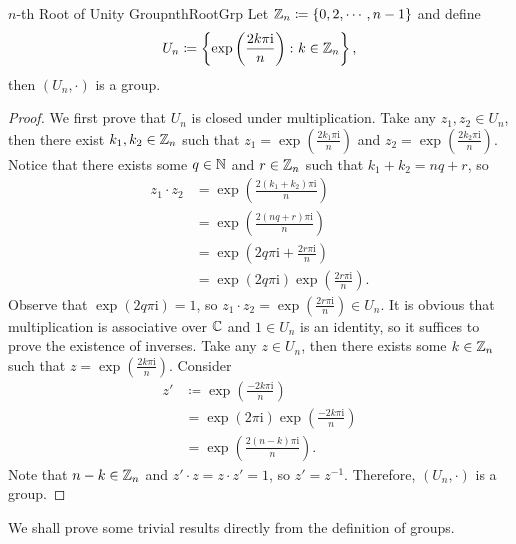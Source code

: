 \documentclass[math]{amznotes}
\theoremstyle{remark}
\newcommand{\0}{\mathbf{0}}
\newcommand{\1}{\mathbf{1}}
\newcommand{\im}{\mathrm{i}}
\begin{document}
\begin{probox}{$n$-th Root of Unity Group}{nthRootGrp}
    Let $\mathbb{Z}_n \coloneqq \left\{0, 2, \cdots, n - 1\right\}$ and define 
    \begin{equation*}
        U_n \coloneqq \left\{\exp\left(\frac{2k\pi\im}{n}\right) \colon k \in \Z_n\right\},
    \end{equation*}
    then $\left(U_n, \cdot\right)$ is a group.
    \tcblower
    \begin{proof}
        We first prove that $U_n$ is closed under multiplication. Take any $z_1, z_2 \in U_n$, then there exist $k_1, k_2 \in \mathbb{Z}_n$ such that $z_1 = \exp\left(\frac{2k_1\pi\im}{n}\right)$ and $z_2 = \exp\left(\frac{2k_2\pi\im}{n}\right)$. Notice that there exists some $q \in \mathbb{N}$ and $r \in \mathbb{Z}_n$ such that $k_1 + k_2 = nq + r$, so
        \begin{align*}
            z_1 \cdot z_2 & = \exp\left(\frac{2\left(k_1 + k_2\right)\pi\im}{n}\right) \\
            & = \exp\left(\frac{2\left(nq + r\right)\pi\im}{n}\right) \\
            & = \exp\left(2q\pi\im + \frac{2r\pi\im}{n}\right) \\
            & = \exp\left(2q\pi\im\right)\exp\left(\frac{2r\pi\im}{n}\right).
        \end{align*}
        Observe that $\exp\left(2q\pi\im\right) = 1$, so $z_1 \cdot z_2 = \exp\left(\frac{2r\pi\im}{n}\right) \in U_n$. It is obvious that multiplication is associative over $\mathbb{C}$ and $1 \in U_n$ is an identity, so it suffices to prove the existence of inverses. Take any $z \in U_n$, then there exists some $k \in \mathbb{Z}_n$ such that $z = \exp\left(\frac{2k\pi\im}{n}\right)$. Consider 
        \begin{align*}
            z' & \coloneqq \exp\left(\frac{-2k\pi\im}{n}\right) \\
            & = \exp\left(2\pi\im\right)\exp\left(\frac{-2k\pi\im}{n}\right) \\
            & = \exp\left(\frac{2\left(n - k\right)\pi\im}{n}\right).
        \end{align*}
        Note that $n - k \in \mathbb{Z}_n$ and $z' \cdot z = z \cdot z' = 1$, so $z' = z^{-1}$. Therefore, $\left(U_n, \cdot\right)$ is a group.
    \end{proof}
\end{probox}
We shall prove some trivial results directly from the definition of groups.
\end{document}
